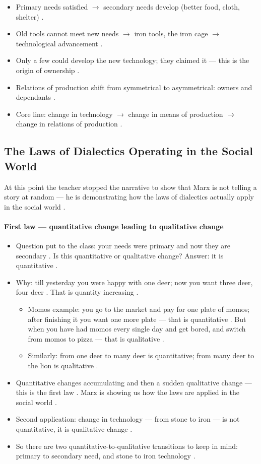 \begin{QuickRevision}
\begin{itemize}
    \item Primary needs satisfied $\rightarrow$ secondary needs develop (better food, cloth, shelter) .
    \item Old tools cannot meet new needs $\rightarrow$ iron tools, the iron cage $\rightarrow$ technological advancement .
    \item Only a few could develop the new technology; they claimed it --- this is the origin of ownership .
    \item Relations of production shift from symmetrical to asymmetrical: owners and dependants .
    \item Core line: change in technology $\rightarrow$ change in means of production $\rightarrow$ change in relations of production .
\end{itemize}
\end{QuickRevision}

\subsection{The Laws of Dialectics Operating in the Social World}
At this point the teacher stopped the narrative to show that Marx is not telling a story at random --- he is demonstrating how the laws of dialectics actually apply in the social world .

\paragraph{First law --- quantitative change leading to qualitative change}
\begin{itemize}
    \item Question put to the class: your needs were primary and now they are secondary . Is this quantitative or qualitative change?  Answer: it is quantitative .
    \item Why: till yesterday you were happy with one deer; now you want three deer, four deer . That is quantity increasing .
    \begin{itemize}
        \item Momos example: you go to the market and pay for one plate of momos; after finishing it you want one more plate --- that is quantitative . But when you have had momos every single day and get bored, and switch from momos to pizza --- that is qualitative .
        \item Similarly: from one deer to many deer is quantitative; from many deer to the lion is qualitative .
    \end{itemize}
    \item Quantitative changes accumulating and then a sudden qualitative change --- this is the first law . Marx is showing us how the laws are applied in the social world .
    \item Second application: change in technology --- from stone to iron --- is not quantitative, it is qualitative change .
    \item So there are two quantitative-to-qualitative transitions to keep in mind: primary to secondary need, and stone to iron technology .
\end{itemize}

